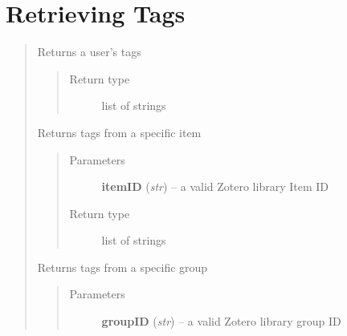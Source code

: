 \documentclass[letterpaper,10pt,english]{sphinxmanual}
\begin{document}
\section{Retrieving Tags}
\label{index:retrieving-tags}\begin{quote}

\begin{fulllineitems}
\label{index:pyzotero.zotero.Zotero.tags}
Returns a user's tags
\begin{quote}\begin{description}
\item[{Return type}] \leavevmode
list of strings

\end{description}\end{quote}

\end{fulllineitems}


\begin{fulllineitems}
\label{index:pyzotero.zotero.Zotero.item_tags}
Returns tags from a specific item
\begin{quote}\begin{description}
\item[{Parameters}] \leavevmode
\textbf{itemID} (\emph{str}) -- a valid Zotero library Item ID

\item[{Return type}] \leavevmode
list of strings

\end{description}\end{quote}

\end{fulllineitems}


\begin{fulllineitems}
\label{index:pyzotero.zotero.Zotero.group_tags}
Returns tags from a specific group
\begin{quote}\begin{description}
\item[{Parameters}] \leavevmode
\textbf{groupID} (\emph{str}) -- a valid Zotero library group ID


\end{description}
\end{quote}
\end{fulllineitems}
\end{quote}
\end{document}
